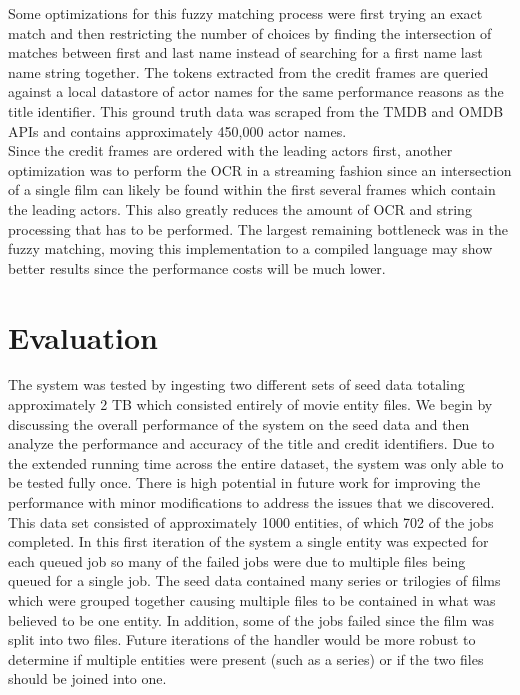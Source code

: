 \documentclass[paper=a4, fontsize=11pt]{scrartcl} %
\numberwithin{equation}{section} %
\numberwithin{figure}{section} %
\numberwithin{table}{section} %
\begin{document}
Some optimizations for this fuzzy matching process were first trying an exact match and then restricting the number of choices by finding the intersection of matches between first and last name instead of searching for a first name last name string together. The tokens extracted from the credit frames are queried against a local datastore of actor names for the same performance reasons as the title identifier. This ground truth data was scraped from the TMDB and OMDB APIs and contains approximately 450,000 actor names. \\

Since the credit frames are ordered with the leading actors first, another optimization was to perform the OCR in a streaming fashion since an intersection of a single film can likely be found within the first several frames which contain the leading actors. This also greatly reduces the amount of OCR and string processing that has to be performed. The largest remaining bottleneck was in the fuzzy matching, moving this implementation to a compiled language may show better results since the performance costs will be much lower. \\

\section{Evaluation}
\label{sec:evaluation}

The system was tested by ingesting two different sets of seed data totaling approximately 2 TB which consisted entirely of movie entity files. We begin by discussing the overall performance of the system on the seed data and then analyze the performance and accuracy of the title and credit identifiers. Due to the extended running time across the entire dataset, the system was only able to be tested fully once. There is high potential in future work for improving the performance with minor modifications to address the issues that we discovered. \\

This data set consisted of approximately 1000 entities, of which 702 of the jobs completed. In this first iteration of the system a single entity was expected for each queued job so many of the failed jobs were due to multiple files being queued for a single job. The seed data contained many series or trilogies of films which were grouped together causing multiple files to be contained in what was believed to be one entity. In addition, some of the jobs failed since the film was split into two files. Future iterations of the handler would be more robust to determine if multiple entities were present (such as a series) or if the two files should be joined into one. \\
\end{document}
